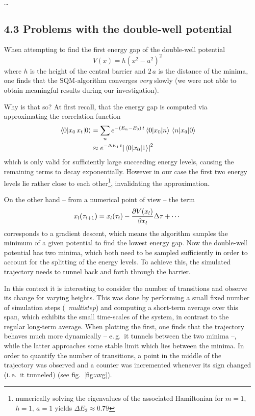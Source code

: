 \documentclass[11pt,a4paper]{scrartcl}
\newcommand*{\figref}[1]{(see fig.~\ref{#1})}
\newcommand{\eg}{e.\,g.}
\newcommand{\ie}{i.\,e.}
\begin{document}
\dots


\subsection*{4.3 Problems with the double-well potential}
When attempting to find the first energy gap of the double-well potential
\begin{equation}
    V(x)=h\left(x^2-a^2\right)^2
    \label{eq:double-well}
\end{equation}
where $h$ is the height of the central barrier and $2\,a$ is the distance of the
minima, one finds that the SQM-algorithm converges \emph{very} slowly (we were not
able to obtain meaningful results during our investigation).

Why is that so? At first recall, that the energy gap is computed via
approximating the correlation function
\begin{align*}
    \ev{x_0\,x_t}{0}&=\sum_{n}e^{-(E_n-E_0)\,t}\mel{0}{x_0}{n}\mel{n}{x_0}{0}
    \\&\approx{e^{-\Delta{E_1}\,t}}\abs{\mel{0}{x_0}{1}}^2
\end{align*}
which is only valid for sufficiently large succeeding energy levels, causing
the remaining terms to decay exponentially. However in our case the first two
energy levels lie rather close to each other\footnote{numerically solving the
eigenvalues of the associated Hamiltonian for $m=1$, $h=1$, $a=1$ yields
$\Delta{E_2}\approx0.79$}, invalidating the approximation.

On the other hand -- from a numerical point of view -- the term
\begin{equation*}
    x_l(\tau_{i+1})=x_l(\tau_i)-\pdv{V(x_l)}{x_l}\Delta\tau+\dotsb
\end{equation*}
corresponds to a gradient descent, which means the algorithm samples the
minimum of a given potential to find the lowest energy gap. Now the double-well
potential has two minima, which both need to be sampled sufficiently in order
to account for the splitting of the energy levels. To achieve this, the
simulated trajectory needs to tunnel back and forth through the barrier.

In this context it is interesting to consider the number of transitions and
observe its change for varying heights. This was done by performing a small
fixed number of simulation steps (\textrightarrow~\emph{multistep}) and
computing a short-term average over this span, which exhibits the small
time-scales of the system, in contrast to the regular long-term average. When
plotting the first, one finds that the trajectory behaves much more dynamically
-- \eg~it tunnels between the two minima --, while the latter approaches some
stable limit which lies between the minima. In order to quantify the number of
transitions, a point in the middle of the trajectory was observed and a
counter was incremented whenever its sign changed (\ie~it tunneled)
\figref{fig:avg}.
\end{document}

